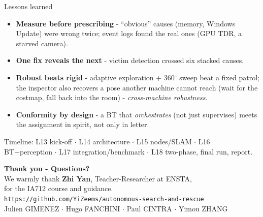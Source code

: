 \documentclass[aspectratio=169,11pt]{beamer}
\begin{document}
\begin{frame}{Lessons learned}
  \begin{itemize}
    \item \textbf{Measure before prescribing} - ``obvious'' causes (memory, Windows Update) were wrong twice; event logs found the real ones (GPU TDR, a starved camera).
    \item \textbf{One fix reveals the next} - victim detection crossed six stacked causes.
    \item \textbf{Robust beats rigid} - adaptive exploration + 360$^\circ$ sweep beat a fixed patrol; the inspector also recovers a pose another machine cannot reach (wait for the costmap, fall back into the room) - \emph{cross-machine robustness}.
    \item \textbf{Conformity by design} - a BT that \emph{orchestrates} (not just supervises) meets the assignment in spirit, not only in letter.
  \end{itemize}
  \vfill
  {\footnotesize\color{nccblue}Timeline: L13 kick-off $\cdot$ L14 architecture $\cdot$ L15 nodes/SLAM $\cdot$ L16 BT+perception $\cdot$ L17 integration/benchmark $\cdot$ L18 two-phase, final run, report.}
\end{frame}

\begin{frame}[plain]
  \centering
  \vfill
  {\Large\color{nccblue}\textbf{Thank you - Questions?}}\\[10pt]
  {\small We warmly thank \textbf{Zhi Yan}, Teacher-Researcher at ENSTA,\\ for the IA712 course and guidance.}\\[14pt]
  {\footnotesize \texttt{https://github.com/YiZeems/autonomous-search-and-rescue}}\\[4pt]
  {\scriptsize Julien GIMENEZ $\cdot$ Hugo FANCHINI $\cdot$ Paul CINTRA $\cdot$ Yimou ZHANG}
  \vfill
\end{frame}
\end{document}
